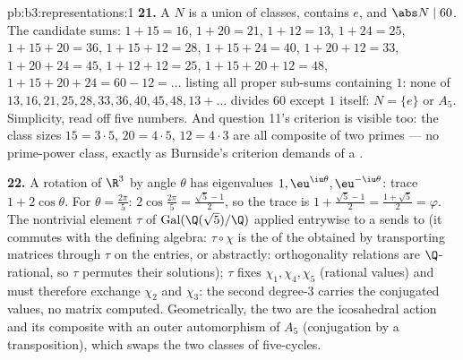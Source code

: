 \begin{solution}{pb:b3:representations:1}
\textbf{21.} A  $N$ is a union of classes,
contains $e$, and $\abs N \mid 60$. The candidate sums:
$1{+}15 = 16$, $1{+}20 = 21$, $1{+}12 = 13$, $1{+}24 = 25$,
$1{+}15{+}20 = 36$, $1{+}15{+}12 = 28$, $1{+}15{+}24 = 40$,
$1{+}20{+}12 = 33$, $1{+}20{+}24 = 45$, $1{+}12{+}12 = 25$,
$1{+}15{+}20{+}12 = 48$, $1{+}15{+}20{+}24 = 60 - 12 = \dots$
listing all proper sub-sums containing $1$: none of $13, 16,
21, 25, 28, 33, 36, 40, 45, 48, 13{+}\dots$ divides $60$
except $1$ itself: $N = \{e\}$ or $A_5$. Simplicity, read off
five numbers. And question 11's criterion is visible too: the
class sizes $15 = 3\cdot5$, $20 = 4\cdot5$, $12 = 4\cdot3$ are
all composite of two primes --- no prime-power class, exactly
as Burnside's criterion demands of a .

\textbf{22.} A rotation of $\R^3$ by angle $\theta$ has
eigenvalues $1, \eu^{\iu\theta}, \eu^{-\iu\theta}$: trace $1 +
2\cos\theta$. For $\theta = \frac{2\pi}5$: $2\cos\frac{2\pi}5
= \frac{\sqrt5 - 1}2$, so the trace is $1 + \frac{\sqrt5-1}2 =
\frac{1+\sqrt5}2 = \varphi$. The nontrivial element $\tau$ of
$\operatorname{Gal}(\Q(\sqrt5)/\Q)$ applied entrywise to a
 sends  to  (it commutes
with the defining algebra: $\tau\circ\chi$ is the  of
the  obtained by transporting matrices through
$\tau$ on the entries, or abstractly: orthogonality relations
are $\Q$-rational, so $\tau$ permutes their solutions);
$\tau$ fixes $\chi_1, \chi_4, \chi_5$ (rational values) and
must therefore exchange $\chi_2$ and $\chi_3$: the second
degree-$3$  carries the conjugated values, no matrix
computed. Geometrically, the two  are the
icosahedral action and its composite with an outer
automorphism of $A_5$ (conjugation by a transposition), which
swaps the two classes of five-cycles.


\end{solution}
